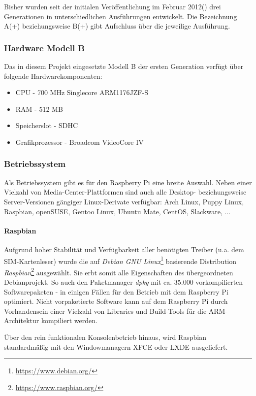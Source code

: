 Bisher wurden seit der initialen Veröffentlichung im Februar 2012(\cite{rasppifoundweb})
drei Generationen in unterschiedlichen Ausführungen
entwickelt. Die Bezeichnung A(+) beziehungsweise B(+) gibt Aufschluss
über die jeweilige Ausführung.

\subsubsection[Hardware Modell B (Schenkel)]{Hardware Modell B}
Das in diesem Projekt eingesetzte Modell B der ersten Generation verfügt über folgende Hardwarekomponenten:
\begin{itemize}
\item CPU - 700 MHz Singlecore ARM1176JZF-S
\item RAM - 512 MB
\item Speicherslot - SDHC
\item Grafikprozessor - Broadcom VideoCore IV
\end{itemize}

\subsubsection[Betriebssystem (Schenkel)]{Betriebssystem}
Als Betriebssystem gibt es für den Raspberry Pi eine breite Auswahl.
Neben einer Vielzahl von Media-Center-Plattformen sind auch alle
Desktop- beziehungsweise Server-Versionen gängiger Linux-Derivate verfügbar:
Arch Linux, Puppy Linux, Raspbian, openSUSE, Gentoo Linux, Ubuntu Mate,
CentOS, Slackware, ...

\paragraph{Raspbian}
Aufgrund hoher Stabilität und Verfügbarkeit aller benötigten Treiber
(u.a. dem SIM-Kartenleser) wurde die auf \textit{Debian GNU Linux}\footnote{\url{https://www.debian.org/}}
basierende Distribution \textit{Raspbian}\footnote{\url{https://www.raspbian.org/}} ausgewählt.
Sie erbt somit alle Eigenschaften des übergeordneten Debianprojekt.
So auch den Paketmanager \textit{dpkg} mit ca. 35.000 vorkompilierten
Softwarepaketen - in einigen Fällen für den Betrieb mit dem
Raspberry Pi optimiert. Nicht vorpaketierte Software kann auf dem Raspberry
Pi durch Vorhandensein einer Vielzahl von Libraries und Build-Tools
für die ARM-Architektur kompiliert werden.

Über den rein funktionalen Konsolenbetrieb hinaus, wird Raspbian standardmäßig mit den
Windowmanagern XFCE oder LXDE ausgeliefert.

